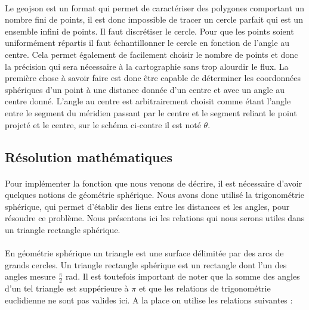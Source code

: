 \documentclass[a4paper]{report}
\begin{document}
\paragraph{} Le geojson est un format qui permet de caractériser des polygones comportant un nombre fini de points, il est donc impossible de tracer un cercle parfait qui est un ensemble infini de points. Il faut discrétiser le cercle. Pour que les points soient uniformément répartis il faut échantillonner le cercle en fonction de l'angle au centre. Cela permet également de facilement choisir le nombre de points et donc la précision qui sera nécessaire à la cartographie sans trop alourdir le flux. La première chose à savoir faire est donc être capable de déterminer les coordonnées sphériques d'un point à une distance donnée d'un centre et avec un angle au centre donné. L'angle au centre est arbitrairement choisit comme étant l'angle entre le segment du méridien passant par le centre et le segment reliant le point projeté et le centre, sur le schéma ci-contre il est noté $\theta$.

\subsection{Résolution mathématiques}

\paragraph{} Pour implémenter la fonction que nous venons de décrire, il est nécessaire d'avoir quelques notions de géométrie sphérique. Nous avons donc utilisé la trigonométrie sphérique, qui permet d'établir des liens entre les distances et les angles, pour résoudre ce problème. Nous présentons ici les relations qui nous serons utiles dans un triangle rectangle sphérique.

\paragraph{} En géométrie sphérique un triangle est une surface délimitée par des arcs de grands cercles. Un triangle rectangle sphérique est un rectangle dont l'un des angles mesure $\frac{\pi}{2}$ rad. Il est toutefois important de noter que la somme des angles d'un tel triangle est suppérieure à $\pi$ et que les relations de trigonométrie euclidienne ne sont pas valides ici. A la place on utilise les relations suivantes :
\end{document}

